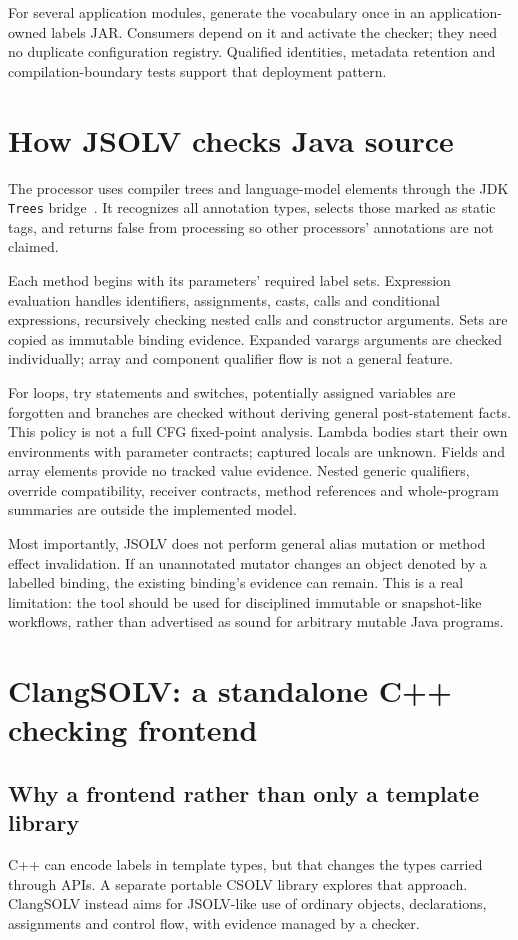 \documentclass[11pt]{article}
\begin{document}
For several application modules, generate the vocabulary once in an
application-owned labels JAR. Consumers depend on it and activate the checker;
they need no duplicate configuration registry. Qualified identities, metadata
retention and compilation-boundary tests support that deployment pattern.

\section{How JSOLV checks Java source}
The processor uses compiler trees and language-model elements through the
JDK \texttt{Trees} bridge~\cite{trees}. It recognizes all annotation types,
selects those marked as static tags, and returns false from processing so
other processors' annotations are not claimed.

Each method begins with its parameters' required label sets. Expression
evaluation handles identifiers, assignments, casts, calls and conditional
expressions, recursively checking nested calls and constructor arguments.
Sets are copied as immutable binding evidence. Expanded varargs arguments
are checked individually; array and component qualifier flow is not a
general feature.

For loops, try statements and switches, potentially assigned variables
are forgotten and branches are checked without deriving general post-statement
facts. This policy is not a full CFG fixed-point analysis. Lambda bodies
start their own environments with parameter contracts; captured locals are
unknown. Fields and array elements provide no tracked value evidence.
Nested generic qualifiers, override compatibility, receiver contracts,
method references and whole-program summaries are outside the implemented
model.

Most importantly, JSOLV does not perform general alias mutation or method
effect invalidation. If an unannotated mutator changes an object denoted by
a labelled binding, the existing binding's evidence can remain. This is
a real limitation: the tool should be used for disciplined immutable or
snapshot-like workflows, rather than advertised as sound for arbitrary
mutable Java programs.

\section{ClangSOLV: a standalone C++ checking frontend}
\subsection{Why a frontend rather than only a template library}
C++ can encode labels in template types, but that changes the types carried
through APIs. A separate portable CSOLV library explores that approach.
ClangSOLV instead aims for JSOLV-like use of ordinary objects, declarations,
assignments and control flow, with evidence managed by a checker.
\end{document}
